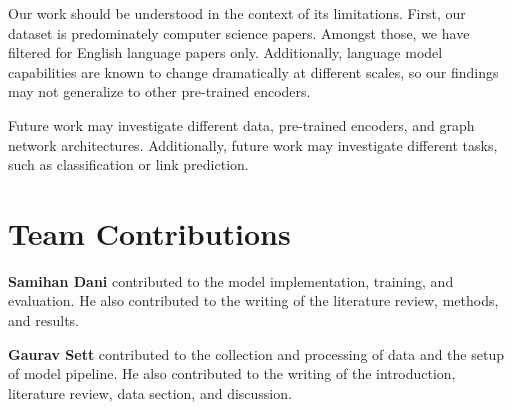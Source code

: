 \documentclass[10pt,twocolumn,letterpaper]{article}
\begin{document}
Our work should be understood in the context of its limitations. First, our dataset is predominately computer science papers. Amongst those, we have filtered for English language papers only. Additionally, language model capabilities are known to change dramatically at different scales, so our findings may not generalize to other pre-trained encoders.

Future work may investigate different data, pre-trained encoders, and graph network architectures. Additionally, future work may investigate different tasks, such as classification or link prediction.

\section*{Team Contributions}

\textbf{Samihan Dani} contributed to the model implementation, training, and evaluation. He also contributed to the writing of the literature review, methods, and results.

\textbf{Gaurav Sett} contributed to the collection and processing of data and the setup of model pipeline. He also contributed to the writing of the introduction, literature review, data section, and discussion.


{\small


}
\end{document}

